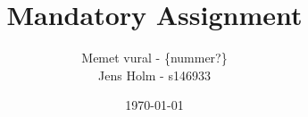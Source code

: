 

\title{Mandatory Assignment}
\date{\today}
\author{Memet vural - \{nummer?\}\\ Jens Holm - s146933}



\maketitle

\tableofcontents

\clearpage














